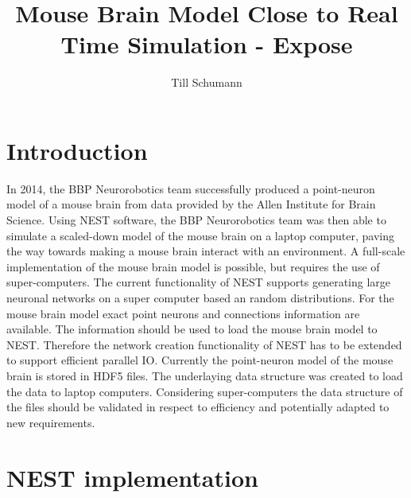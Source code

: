 \documentclass[a4paper]{article}
\title{Mouse Brain Model Close to Real Time Simulation - Expose}
\author{Till Schumann}
\begin{document}
   \maketitle


\section{Introduction}
In 2014, the BBP Neurorobotics team successfully produced a point-neuron model
of a mouse brain from data provided by the Allen Institute for Brain Science.
Using NEST software, the BBP Neurorobotics team was then able to simulate a
scaled-down model of the mouse brain on a laptop computer, paving the way towards
making a mouse brain interact with an environment. A full-scale implementation of
the mouse brain model is possible, but requires the use of super-computers.
The current functionality of NEST supports  generating large neuronal networks
on a super computer based an random distributions. For the mouse brain model
exact point neurons and connections information are available. The information should
be used to load the mouse brain model to NEST. Therefore the network creation
functionality of NEST has to be extended to support efficient parallel IO.
Currently the point-neuron model of the mouse brain is stored in HDF5 files.
The underlaying data structure was created to load the data to laptop computers.
Considering super-computers the data structure of the files should be
validated in respect to efficiency and potentially adapted to new requirements.


\section{NEST implementation}
\end{document}
